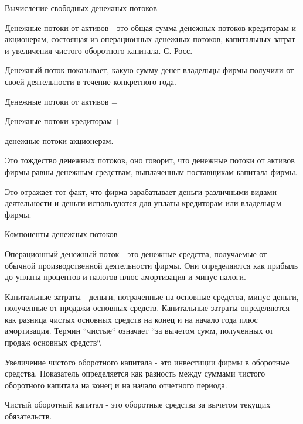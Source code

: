 \documentclass[_Venture_p2.tex]{subfiles}
\begin{document}
\begin{frame}[allowframebreaks]{Вычисление свободных денежных потоков}
\begin{block}{Денежные потоки от активов}
	\quad
	- это общая сумма денежных потоков кредиторам и акционерам, состоящая из операционных денежных потоков, капитальных затрат и увеличения чистого оборотного капитала. С. Росс.
\end{block}

\pagebreak

Денежный поток показывает, какую сумму денег владельцы фирмы получили от своей деятельности в течение конкретного года.

Денежные потоки от активов = 

Денежные потоки кредиторам + 

денежные потоки акционерам.

\pagebreak
Это тождество денежных потоков, оно говорит, что денежные потоки  от активов фирмы равны денежным средствам, выплаченным поставщикам капитала фирмы. 

Это отражает тот факт, что фирма зарабатывает деньги различными видами деятельности и деньги используются для уплаты кредиторам или владельцам фирмы.

\end{frame}

\begin{frame}[allowframebreaks]{Компоненты денежных потоков}{}
\begin{block}{Операционный денежный поток}
	\quad
	- это денежные средства, получаемые от обычной производственной деятельности фирмы. Они определяются как прибыль до уплаты процентов и налогов плюс амортизация и минус налоги.
\end{block}

\pagebreak


\begin{block}{Капитальные затраты }
	\quad
	- деньги, потраченные на основные средства, минус деньги, полученные от продажи основных средств. Капитальные затраты определяются как разница чистых основных средств на конец и на начало года плюс амортизация. Термин ``чистые`` означает ``за вычетом сумм, полученных от продаж основных средств``.
\end{block}

\pagebreak

\begin{block}{Увеличение чистого оборотного капитала}
	\quad
	- это инвестиции фирмы в оборотные средства. Показатель определяется как разность между суммами чистого оборотного капитала  на конец и на начало отчетного периода.
\end{block}

\pagebreak

 \begin{block}{Чистый оборотный капитал }
	\quad
	- это оборотные средства за вычетом текущих обязательств.
\end{block}

\end{frame}
\end{document}
